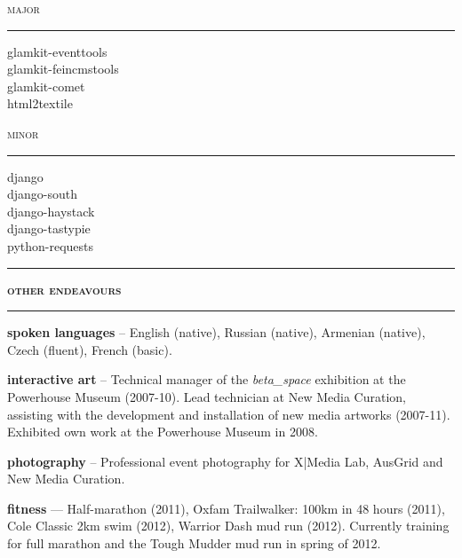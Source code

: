 \documentclass[a4paper,12pt]{article}
\begin{document}
\begin{spacing}{0.95}
\begin{minipage}[t]{95.5mm}
	\begin{minipage}[t]{45.25mm}
		{\large\textsc{major}}\\
		\vspace{-3.1mm}%
		\rule[3mm]{\linewidth}{0.25mm}
				
		{\normalsize
		glamkit-eventtools\\
		glamkit-feincmstools\\
		glamkit-comet\\
		html2textile}
	\end{minipage}%
	\hspace{5mm}%
	\begin{minipage}[t]{45.25mm}
		{\large\textsc{minor}}\\
		\vspace{-3.1mm}%
		\rule[3mm]{\linewidth}{0.25mm}
		
		{\normalsize
		django\\
		django-south\\
		django-haystack\\
		django-tastypie\\
		python-requests}
	\end{minipage}

	\vspace{4mm}
	\rule[1mm]{\linewidth}{1mm}
	{\Large\textsc{\textbf{other endeavours}}}\\
	\vspace{2.5mm}%
	\rule[1mm]{\linewidth}{1mm}
	
	{\small
	\textbf{\textsf{spoken languages}} -- English (native), Russian (native), Armenian (native), Czech (fluent), French (basic).
	
	\vspace{3mm}
	\textbf{\textsf{interactive art}} -- Technical manager of the \emph{beta\_space} exhibition at the Powerhouse Museum (2007-10). Lead technician at New Media Curation, assisting with the development and installation of  new media artworks (2007-11). Exhibited own work at the Powerhouse Museum in 2008.
	
	\vspace{3mm}
	\textbf{\textsf{photography}} -- Professional event photography for X|Media Lab, AusGrid and New Media Curation.
	
	\vspace{3mm}
	\textbf{\textsf{fitness}} --- Half-marathon (2011), Oxfam Trailwalker: 100km in 48 hours (2011), Cole Classic 2km swim (2012), Warrior Dash mud run (2012). Currently training for full marathon and the Tough Mudder mud run in spring of 2012.%
	}%
\end{minipage}\\
\vspace{2mm}


\end{spacing}
\end{document}
